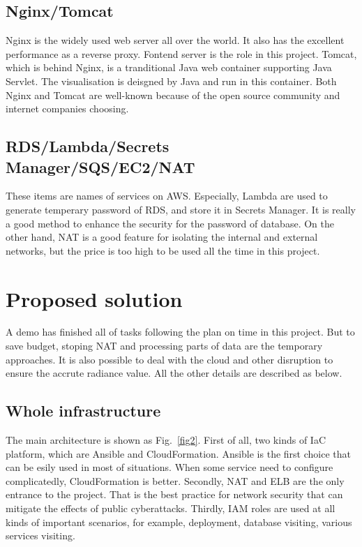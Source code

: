 \documentclass[conference]{IEEEtran}
\begin{document}
\subsection{Nginx/Tomcat}
Nginx is the widely used web server all over the world. It also has the excellent performance as a reverse proxy. 
Fontend server is the role in this project. Tomcat, which is behind Nginx, is a tranditional Java web container supporting 
Java Servlet. The visualisation is deisgned by Java and run in this container. Both Nginx and Tomcat are well-known because of 
the open source community and internet companies choosing.

\subsection{RDS/Lambda/Secrets Manager/SQS/EC2/NAT}
These items are names of services on AWS. Especially, Lambda are used to generate temperary password of RDS, and store it in 
Secrets Manager. It is really a good method to enhance the security for the password of database. On the other hand, NAT is a 
good feature for isolating the internal and external networks, but the price is too high to be used all the time in this project.

\section{Proposed solution}

A demo has finished all of tasks following the plan on time in this project. But to save budget, stoping NAT and processing parts of data are 
the temporary approaches. It is also possible to deal with the cloud and other disruption to ensure the accrute radiance value. All the 
other details are described as below.

\subsection{Whole infrastructure}
The main architecture is shown as Fig.~\ref{fig2}. First of all, two kinds of IaC platform, which are Ansible and CloudFormation.
Ansible is the first choice that can be esily used in most of situations. When some service need to configure complicatedly, CloudFormation is 
better. Secondly, NAT and ELB are the only entrance to the project. That is the best practice for network security that can mitigate the effects 
of public cyberattacks. Thirdly, IAM roles are used at all kinds of important scenarios, for example, deployment, database visiting, various services visiting.
\end{document}
